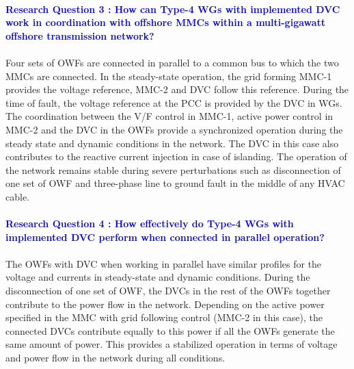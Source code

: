 \paragraph{\textcolor{blue}{Research Question 3 : How can Type-4 \gls{WG}s with implemented \gls{DVC} work in coordination with offshore \gls{MMC}s within a multi-gigawatt offshore transmission network?}}

\paragraph{} Four sets of \gls{OWF}s are connected in parallel to a common bus to which the two \gls{MMC}s are connected. In the steady-state operation, the grid forming \gls{MMC}-1 provides the voltage reference, \gls{MMC}-2 and \gls{DVC} follow this reference. During the time of fault, the voltage reference at the \gls{PCC} is provided by the \gls{DVC} in \gls{WG}s. The coordination between the V/F control in \gls{MMC}-1, active power control in \gls{MMC}-2 and the \gls{DVC} in the \gls{OWF}s provide a synchronized operation during the steady state and dynamic conditions in the network. The \gls{DVC} in this case also contributes to the reactive current injection in case of islanding. The operation of the network remains stable during severe perturbations such as disconnection of one set of \gls{OWF} and three-phase line to ground fault in the middle of any \gls{HVAC} cable.

\paragraph{\textcolor{blue}{Research Question 4 : How effectively do Type-4 \gls{WG}s with implemented \gls{DVC} perform when connected in parallel operation?}}

\paragraph{} The \gls{OWF}s with \gls{DVC} when working in parallel have similar profiles for the voltage and currents in steady-state and dynamic conditions. During the disconnection of one set of \gls{OWF}, the \gls{DVC}s in the rest of the \gls{OWF}s together contribute to the power flow in the network. Depending on the active power specified in the \gls{MMC} with grid following control (\gls{MMC}-2 in this case), the connected \gls{DVC}s contribute equally to this power if all the \gls{OWF}s generate the same amount of power. This provides a stabilized operation in terms of voltage and power flow in the network during all conditions.  


